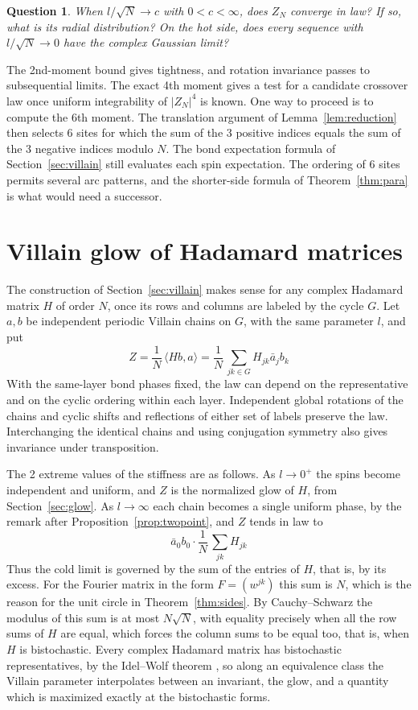 \documentclass[11pt,a4paper]{article}
\newtheorem{question}[thm]{Question}
\theoremstyle{remark}
\begin{document}
\begin{samepage}
\begin{question}\label{que:law}
When $l/\sqrt N\to c$ with $0<c<\infty$, does $Z_N$ converge in law?
If so, what is its radial distribution? On the hot side, does every
sequence with $l/\sqrt N\to0$ have the complex Gaussian limit?
\end{question}
\end{samepage}

The 2nd-moment bound gives tightness, and rotation invariance passes
to subsequential limits. The exact 4th moment gives a test for a
candidate crossover law once uniform integrability of $|Z_N|^4$ is known.
One way to proceed is to compute the 6th moment. The translation
argument of Lemma~\ref{lem:reduction} then selects 6 sites for which the
sum of the 3 positive indices equals the sum of the 3 negative
indices modulo $N$. The bond expectation formula of Section~\ref{sec:villain} still evaluates each spin
expectation. The ordering of 6 sites permits several arc patterns, and the
shorter-side formula of Theorem~\ref{thm:para} is what would need a successor.

\section{Villain glow of Hadamard matrices}\label{sec:general}

The construction of Section~\ref{sec:villain} makes sense for any complex Hadamard matrix $H$ of order $N$, once its rows and columns are labeled by the cycle $G$. Let $a,b$ be independent periodic Villain chains on $G$, with the same parameter $l$, and put
\[
 Z=\frac1N\,\langle Hb,a\rangle=\frac1N\,\sum_{jk\in G}H_{jk}\bar a_jb_k
\]
With the same-layer bond phases fixed, the law can depend on the representative and on the cyclic ordering within each layer. Independent global rotations of the chains and cyclic shifts and reflections of either set of labels preserve the law. Interchanging the identical chains and using conjugation symmetry also gives invariance under transposition.

The 2 extreme values of the stiffness are as follows. As $l\to0^+$ the spins become independent and uniform, and $Z$ is the normalized glow of $H$, from Section~\ref{sec:glow}. As $l\to\infty$ each chain becomes a single uniform phase, by the remark after Proposition~\ref{prop:twopoint}, and $Z$ tends in law to
\[
 \bar a_0b_0\cdot\frac1N\,\sum_{jk}H_{jk}
\]
Thus the cold limit is governed by the sum of the entries of $H$, that is, by its excess. For the Fourier matrix in the form $F=(w^{jk})$ this sum is $N$, which is the reason for the unit circle in Theorem~\ref{thm:sides}. By Cauchy--Schwarz the modulus of this sum is at most $N\sqrt N$, with equality precisely when all the row sums of $H$ are equal, which forces the column sums to be equal too, that is, when $H$ is bistochastic. Every complex Hadamard matrix has bistochastic representatives, by the Idel--Wolf theorem \cite{iwo}, so along an equivalence class the Villain parameter interpolates between an invariant, the glow, and a quantity which is maximized exactly at the bistochastic forms.
\end{document}

